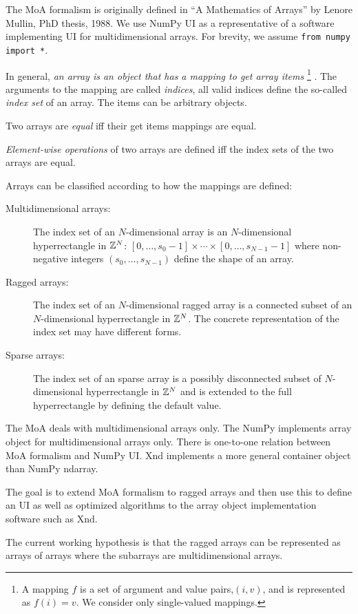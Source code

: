 {The MoA formalism is originally defined in ``A Mathematics of Arrays''
by Lenore Mullin, PhD thesis, 1988.  We use NumPy UI as a
representative of a software implementing UI for multidimensional
arrays. For brevity, we assume \verb+from numpy import *+.

In general, \emph{an array is an object that has a mapping to get
  array items} \footnote{A mapping $f$ is a set of argument and value
  pairs,$(i,v)$, and is represented as $f(i)=v$. We consider only
  single-valued mappings.} . The arguments to the mapping are called
\emph{indices}, all valid indices define the so-called \emph{index
  set} of an array. The items can be arbitrary objects.

Two arrays are \emph{equal} iff their get items mappings are equal.

\emph{Element-wise operations} of two arrays are defined iff the index
sets of the two arrays are equal.

Arrays can be classified according to how the mappings are defined:
\begin{description}
\item[Multidimensional arrays:] The index set of
  an $N$-dimensional array is an $N$-dimensional hyperrectangle in
  ${\mathbb{Z}}^N$: $[0,\ldots,s_0-1]\times\cdots\times[0,\ldots,s_{N-1}-1]$
  where non-negative integers $(s_0,\ldots,s_{N-1})$ define the shape
  of an array.
\item[Ragged arrays:] The index set of an
  $N$-dimensional ragged array is a connected subset of an
  $N$-dimensional hyperrectangle in ${\mathbb{Z}}^N$. The concrete
  representation of the index set may have different forms.
\item[Sparse arrays:] The index set of an sparse array is a possibly
  disconnected subset of $N$-dimensional hyperrectangle in ${\mathbb{Z}}^N$ and
  is extended to the full hyperrectangle by defining the default
  value.
\end{description}

The MoA deals with multidimensional arrays only.  The NumPy implements
array object for multidimensional arrays only. There is one-to-one
relation between MoA formalism and NumPy UI. Xnd implements a more
general container object than NumPy ndarray.

The goal is to extend MoA formalism to ragged arrays and then use this
to define an UI as well as optimized algorithms to the array object
implementation software such as Xnd. 

The current working hypothesis is that the ragged arrays can be
represented as arrays of arrays where the subarrays are
multidimensional arrays.

}
